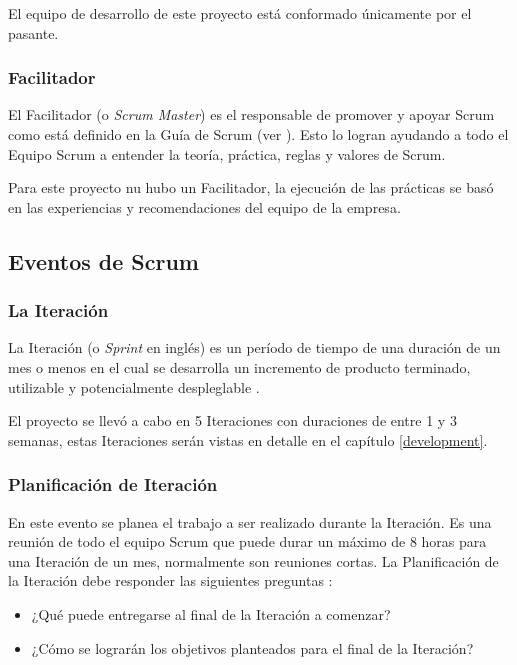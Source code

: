 El equipo de desarrollo de este proyecto está conformado únicamente por el pasante.

\subsubsection{Facilitador} \label{scrumMaster}
El Facilitador (o \emph{Scrum Master}) es el responsable de promover y apoyar Scrum como está definido en la Guía de Scrum (ver \cite{scrumSchwaber}). Esto lo logran ayudando a todo el Equipo Scrum a entender la teoría, práctica, reglas y valores de Scrum. \cite{scrumSchwaber}

Para este proyecto nu hubo un Facilitador, la ejecución de las prácticas se basó en las experiencias y recomendaciones del equipo de la empresa.

\subsection{Eventos de Scrum}
\subsubsection{La Iteración} \label{sprint}
La Iteración (o \emph{Sprint} en inglés) es un período de tiempo de una duración de un mes o menos en el cual se desarrolla un incremento de producto terminado, utilizable y potencialmente despleglable \cite{scrumSchwaber}.

El proyecto se llevó a cabo en 5 Iteraciones con duraciones de entre 1 y 3 semanas, estas Iteraciones serán vistas en detalle en el capítulo \ref{development}.

\subsubsection{Planificación de Iteración}
En este evento se planea el trabajo a ser realizado durante la Iteración. Es una reunión de todo el equipo Scrum que puede durar un máximo de 8 horas para una Iteración de un mes, normalmente son reuniones cortas. La Planificación de la Iteración debe responder las siguientes preguntas \cite{scrumSchwaber}:

\begin{itemize}
    \item ¿Qué puede entregarse al final de la Iteración a comenzar?
    \item ¿Cómo se lograrán los objetivos planteados para el final de la Iteración?
\end{itemize}

